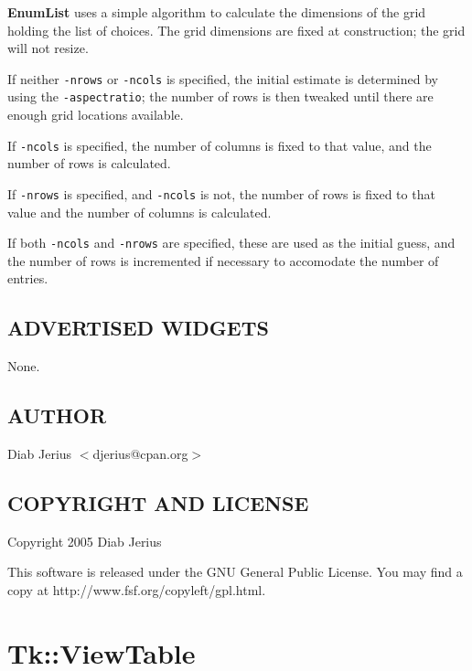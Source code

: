 \documentclass{article}
\begin{document}
\textbf{EnumList} uses a simple algorithm to calculate the dimensions of the
grid holding the list of choices.  The grid dimensions are fixed at
construction; the grid will not resize.



If neither \texttt{-nrows} or \texttt{-ncols} is specified, the initial estimate
is determined by using the \texttt{-aspectratio}; the number of rows is then
tweaked until there are enough grid locations available.



If \texttt{-ncols} is specified, the number of columns is fixed to that value,
and the number of rows is calculated.



If \texttt{-nrows} is specified, and \texttt{-ncols} is not, the number of rows is
fixed to that value and the number of columns is calculated.



If both \texttt{-ncols} and \texttt{-nrows} are specified, these are used as the
initial guess, and the number of rows is incremented if necessary to
accomodate the number of entries.

\subsection*{ADVERTISED WIDGETS\label{Tk::EnumList_ADVERTISED_WIDGETS}}


None.

\subsection*{AUTHOR\label{Tk::EnumList_AUTHOR}}


Diab Jerius $<$djerius@cpan.org$>$

\subsection*{COPYRIGHT AND LICENSE\label{Tk::EnumList_COPYRIGHT_AND_LICENSE}}


Copyright 2005 Diab Jerius



This software is released under the GNU General Public License. You
may find a copy at \textsf{http://www.fsf.org/copyleft/gpl.html}.

\clearpage
\section{Tk::ViewTable\label{Tk::ViewTable}}
\end{document}

